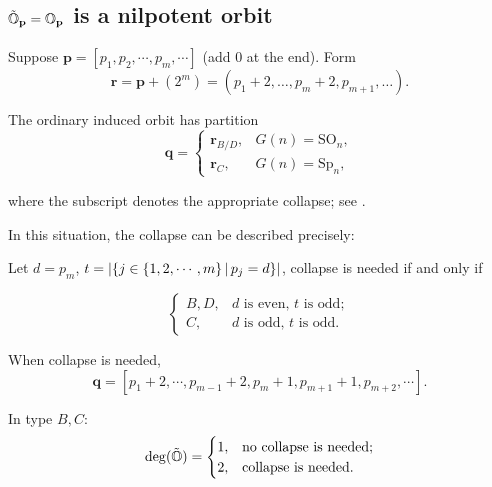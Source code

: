 \subsection{$\tilde{\mathbb{O}}_{\mathbf{p}} = \mathbb{O}_{\mathbf{p}}$ is a nilpotent orbit}

Suppose $\mathbf{p} = [p_1,p_2,\cdots,p_m,\cdots]$ (add $0$ at the end). Form
\[
\mathbf r=\mathbf p+(2^m)
=(p_1+2,\ldots,p_m+2,p_{m+1},\ldots).
\]

The ordinary induced orbit has partition
\[
\mathbf q=
\begin{cases}
\mathbf r_{B/D},&G(n)=\mathrm{SO}_n,\\
\mathbf r_C,&G(n)=\mathrm{Sp}_n,
\end{cases}
\]

where the subscript denotes the appropriate collapse; see
\cite[Proposition~5.9(ii)]{MMY2025}.

In this situation, the collapse can be described precisely:

Let $d = p_m$, $t = \lvert\{j \in \{1,2,\cdots,m\}\,|\, p_j = d \}\rvert$, collapse is needed if and only if 

\[
  \begin{cases}
    B,D,  & \text{$d$ is even, $t$ is odd};\\
    C,    & \text{$d$ is odd, $t$ is odd}.
  \end{cases}
\]  

When collapse is needed, 
\[
  \mathbf{q} = [p_1 + 2, \cdots, p_{m-1} + 2, p_{m} + 1, p_{m+1} +1, p_{m+2}, \cdots].
\]

\begin{prop} In type $B,C$:
  \[  
    \deg(\tilde{\mathbb{O}}) = 
    \begin{cases}
      1, & \text{no collapse is needed};\\
      2, & \text{collapse is needed}.
    \end{cases}
  \]
\end{prop}


